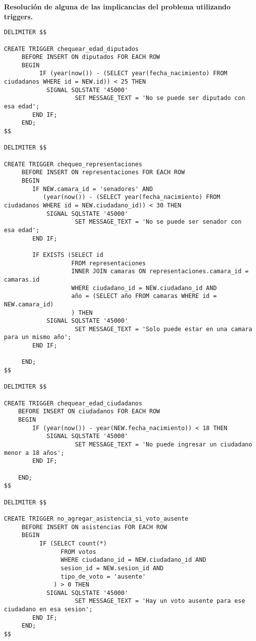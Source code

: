 \textbf{Resolución de alguna de las implicancias del problema utilizando
triggers.}

\begin{verbatim}
DELIMITER $$
 
CREATE TRIGGER chequear_edad_diputados
     BEFORE INSERT ON diputados FOR EACH ROW
     BEGIN
          IF (year(now()) - (SELECT year(fecha_nacimiento) FROM ciudadanos WHERE id = NEW.id)) < 25 THEN 
     		SIGNAL SQLSTATE '45000'
                    SET MESSAGE_TEXT = 'No se puede ser diputado con esa edad';
     	END IF;
     END;
$$

DELIMITER $$ 
 
CREATE TRIGGER chequeo_representaciones
     BEFORE INSERT ON representaciones FOR EACH ROW
     BEGIN
        IF NEW.camara_id = 'senadores' AND 
           (year(now()) - (SELECT year(fecha_nacimiento) FROM ciudadanos WHERE id = NEW.ciudadano_id)) < 30 THEN 
     		SIGNAL SQLSTATE '45000'
                    SET MESSAGE_TEXT = 'No se puede ser senador con esa edad';
     	END IF;
     	
     	IF EXISTS (SELECT id 
				   FROM representaciones 
				   INNER JOIN camaras ON representaciones.camara_id = camaras.id 
                   WHERE ciudadano_id = NEW.ciudadano_id AND 
                   año = (SELECT año FROM camaras WHERE id = NEW.camara_id) 
                   ) THEN 
     		SIGNAL SQLSTATE '45000'
                    SET MESSAGE_TEXT = 'Solo puede estar en una camara para un mismo año';
     	END IF;
     	
     END;
$$

DELIMITER $$

CREATE TRIGGER chequear_edad_ciudadanos
	BEFORE INSERT ON ciudadanos FOR EACH ROW
	BEGIN
		IF (year(now()) - year(NEW.fecha_nacimiento)) < 18 THEN 
			SIGNAL SQLSTATE '45000'
                    SET MESSAGE_TEXT = 'No puede ingresar un ciudadano menor a 18 años';
		END IF;
		
	END;
$$

DELIMITER $$

CREATE TRIGGER no_agregar_asistencia_si_voto_ausente
     BEFORE INSERT ON asistencias FOR EACH ROW
     BEGIN
          IF (SELECT count(*) 
          		FROM votos 	
          		WHERE ciudadano_id = NEW.ciudadano_id AND
          		sesion_id = NEW.sesion_id AND
          		tipo_de_voto = 'ausente' 
              ) > 0 THEN 
     		SIGNAL SQLSTATE '45000'
                    SET MESSAGE_TEXT = 'Hay un voto ausente para ese ciudadano en esa sesion';
     	END IF;
     END;
$$


\end{verbatim}
